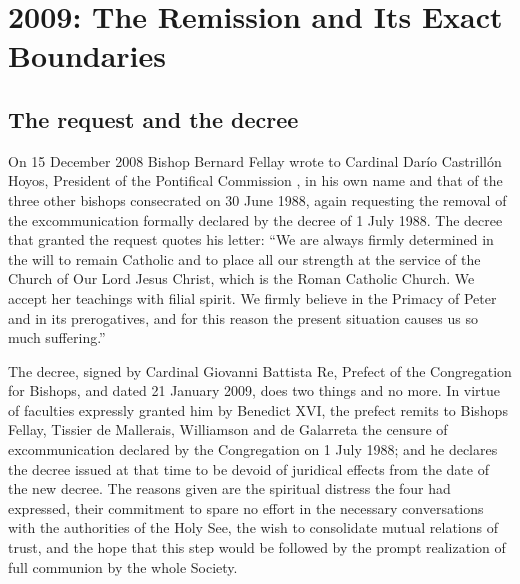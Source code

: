 \section{2009: The Remission and Its Exact Boundaries}

\subsection{The request and the decree}

On 15 December 2008 Bishop Bernard Fellay wrote to Cardinal Darío
Castrillón Hoyos, President of the Pontifical Commission , in his own name and that of the three other bishops consecrated on
30 June 1988, again requesting the removal of the excommunication
 formally declared by the decree of 1 July 1988.
The decree that granted the request quotes his letter: ``We are always
firmly determined in the will to remain Catholic and to place all our
strength at the service of the Church of Our Lord Jesus Christ, which is
the Roman Catholic Church. We accept her teachings with filial spirit. We
firmly believe in the Primacy of Peter and in its prerogatives, and for
this reason the present situation causes us so much
suffering.''

The decree, signed by Cardinal Giovanni Battista Re, Prefect of the
Congregation for Bishops, and dated 21 January 2009, does two things and
no more. In virtue of faculties expressly granted him by Benedict XVI, the
prefect remits to Bishops Fellay, Tissier de Mallerais, Williamson and de
Galarreta the censure of excommunication 
declared by the Congregation on 1 July 1988; and he declares the decree
issued at that time to be devoid of juridical effects from the date of the
new decree. The reasons given are the spiritual distress the four had
expressed, their commitment to spare no effort in the necessary
conversations with the authorities of the Holy See, the wish to consolidate
mutual relations of trust, and the hope that this step would be followed
by the prompt realization of full communion by the whole
Society.

